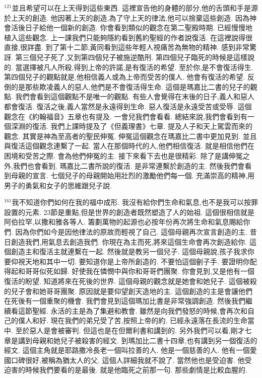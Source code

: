 \documentclass{book}
\begin{document}
$^{121}$並且希望可以在上天得到這些東西.
這裡宣告他的身體的部分,他的舌頭和手是源於上天的創造.
他因著上天的創造,為了守上天的律法,他可以捨棄這些創造.
因為神會活後日子給他一個新的創造.
你會看到類似的觀念在第二聖殿時期.
已經慢慢地植入這些觀念.
上一課我們只能夠隱約看到舊約聖經的作者說復活.
在這裡說得很直接,很詳盡.
到了第十二節,黃同看到這些年輕人視痛苦為無物的精神.
感到非常驚訝.
第三個兒子死了,又到第四個兒子被施逆酷刑.
第四個兒子臨死的時候是這樣說的.
當選擇被凡人所殺,得到上帝的許諾,是有復活的希望.
至於你,是不會復活得生.
第四個兒子的觀點就是,他相信義人或為上帝而受苦的僕人.
他會有復活的希望.
反倒的是那些欺凌義人的惡人,他們是不會復活得生命.
這個是瑪嘉比二書的兒子的觀點.
我們會看到這個觀點不是唯一的觀點.
有些人會覺得在末後的日子,義人和惡人都會復活.
復活之後,義人當然是永遠得到生命.
惡人復活是永遠受苦或受辱.
這個觀念在《約翰福音》五章也有提及.
一會兒我們會看看.
總結來說,我們會看到有一個深淵的復活.
我們上課時提及了《但義理書》七章.
提及人子和天上駕雲而來的觀念.
其實是神為至高者的聖民伸冤.
伸冤這個觀念在瑪嘉比二書中更加見到.
並且與復活這個觀念連繫了一起.
當人在那個時代的人,他們相信復活.
就是相信他們在困境和受苦之際.
會為他們伸冤的主.
接下來看下去也是很精彩.
除了是講伸冤之外,我們也會看到.
瑪嘉比二書所說的復活.
是非常連繫於創造的主.
然後我們會看到母親的宣言.
七個兒子的母親開始用壯烈的激勵他們每一個.
充滿崇高的精神,用男子的勇氣和女子的思維跟兒子說.

$^{161}$我不知道你們如何在我的福中成形.
我沒有給你們生命和氣息,也不是我可以按罪設置的元素.
23節是重點,但是世界的創造者既然塑造了人的始祖.
這個很相信就是阿伯拉罕,以撒和雅各等人.
籌劃萬物的起源也必按年份再次將生命和氣息賜給你們.
因為你們如今是因他律法的原故而輕視了自己.
這個母親再次宣言創造的主.
昔日創造我們,用氣息去創造我們.
你現在為主而死,將來這個生命會再次創造給你.
這個創造主和復活主就連繫在一起.
然後就是教另一個兒子.
這個母親說,孩子我求你要仰視天地和其中一切.
要知道你是上帝所創造的.
不要怕這個劊子手.
要證明你配得起和哥哥似死如歸.
好使我在憐憫中與你和哥哥們團聚.
你會見到,又是他有一個復活的盼望.
知道將來在死後的世界.
這個母親的觀念就是她會和她兒子.
這個被殺的兒子會和她哥哥團聚.
原因就是要仰望創天造地的主.
這個創造的主是會讓他們在死後有一個重聚的機會.
我們會見到這個瑪加比書是非常強調創造.
然後我們繼續看這節聖經.
永活的主是為了集避和教會.
雖然是向我們發怒的時候,會再次和自己的僕人和好.
現在我們的弟兄受了苦,按照上帝的約.
已經永遠落在長流的生命當中.
至於惡人是會被審判.
但這也是在但爾利書和講到的.
另外我們可以看,剛才七章是講到母親和她兒子被殺害的經文.
到瑪加比二書十四章,也有講到另一個復活的經文.
這個主角就是耶路撒冷長老一個叫拉善的人.
他是一個慈善的人.
他有一個愛國口碑很好,被稱為猶太人的父.
這個人詳細我就不說了.
當然他也是受迫害.
他受迫害的時候我們要看的是最後.
就是他臨死之前那一句.
那些劇情是比較血腥的.
\end{document}
